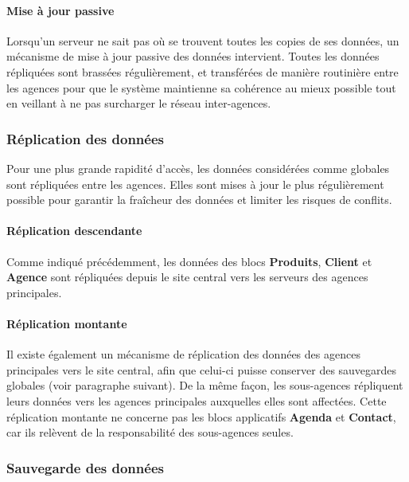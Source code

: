 \paragraph{Mise à jour passive}

Lorsqu'un serveur ne sait pas où se trouvent toutes les copies de ses données, un mécanisme de mise à
jour passive des données intervient. Toutes les données répliquées sont brassées régulièrement,
et transférées de manière routinière entre les agences pour que le système maintienne sa cohérence au
mieux possible tout en veillant à ne pas surcharger le réseau inter-agences.

\subsubsection{Réplication des données}

Pour une plus grande rapidité d'accès, les données considérées comme globales sont répliquées entre les
agences. Elles sont mises à jour le plus régulièrement possible pour garantir la fraîcheur des données
et limiter les risques de conflits.

\paragraph{Réplication descendante}

Comme indiqué précédemment, les données des blocs \textbf{Produits}, \textbf{Client} et \textbf{Agence}
sont répliquées depuis le site central vers les serveurs des agences principales.

\paragraph{Réplication montante}

Il existe également un mécanisme de réplication des données des agences principales vers le site central,
afin que celui-ci puisse conserver des sauvegardes globales (voir paragraphe suivant). De la même façon,
les sous-agences répliquent leurs données vers les agences principales auxquelles elles sont affectées.
Cette réplication montante ne concerne pas les blocs applicatifs \textbf{Agenda} et \textbf{Contact}, car
ils relèvent de la responsabilité des sous-agences seules.

\subsubsection{Sauvegarde des données}

